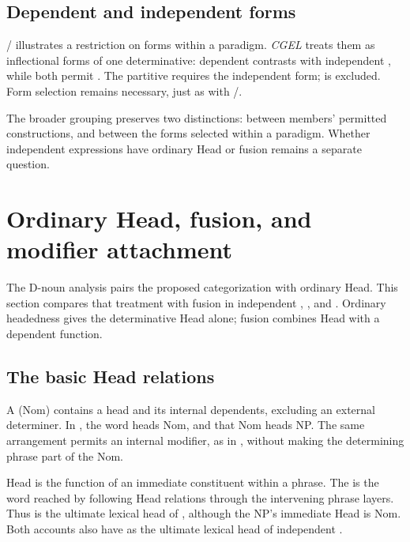 \documentclass[12pt]{article}
\begin{document}
\subsection{Dependent and independent forms}\label{sec:form-selection}

/ illustrates a restriction on forms within a paradigm. \textit{CGEL} treats them as inflectional forms of one determinative: dependent  contrasts with independent , while both permit  \citep[389--390]{huddleston2002}. The partitive  requires the independent form;  is excluded. Form selection remains necessary, just as with /.

The broader grouping preserves two distinctions: between members' permitted constructions, and between the forms selected within a paradigm. Whether independent expressions have ordinary Head or fusion remains a separate question.

\section{Ordinary Head, fusion, and modifier attachment}\label{sec:evidence}

The D-noun analysis pairs the proposed categorization with ordinary Head. This section compares that treatment with fusion in independent , , and . Ordinary headedness gives the determinative Head alone; fusion combines Head with a dependent function.

\subsection{The basic Head relations}\label{sec:head-relations}

A  (Nom) contains a head and its internal dependents, excluding an external determiner. In , the word  heads Nom, and that Nom heads NP. The same arrangement permits an internal modifier, as in , without making the determining phrase part of the Nom.

Head is the function of an immediate constituent within a phrase. The  is the word reached by following Head relations through the intervening phrase layers. Thus  is the ultimate lexical head of , although the NP's immediate Head is Nom. Both accounts also have  as the ultimate lexical head of independent .
\end{document}
